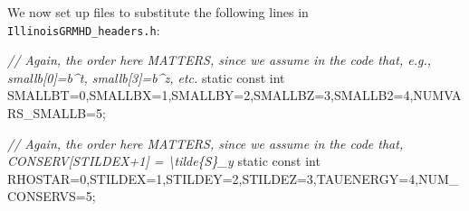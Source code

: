 \documentclass[landscape,letterpaper,10pt,english]{article}
\newenvironment{Shaded}{}{}
\newcommand{\DataTypeTok}[1]{\textcolor[rgb]{0.56,0.13,0.00}{{#1}}}
\newcommand{\DecValTok}[1]{\textcolor[rgb]{0.25,0.63,0.44}{{#1}}}
\newcommand{\CommentTok}[1]{\textcolor[rgb]{0.38,0.63,0.69}{\textit{{#1}}}}
\newcommand{\NormalTok}[1]{{#1}}
\begin{document}
\[\label{smallb_and_conservs_vars}\]

We now set up files to substitute the following lines in
\texttt{IllinoisGRMHD\_headers.h}:

\begin{Shaded}
\begin{Highlighting}[]
\CommentTok{// Again, the order here MATTERS, since we assume in the code that, e.g., smallb[0]=b^t, smallb[3]=b^z, etc.}
\DataTypeTok{static} \DataTypeTok{const} \DataTypeTok{int}\NormalTok{ SMALLBT=}\DecValTok{0}\NormalTok{,SMALLBX=}\DecValTok{1}\NormalTok{,SMALLBY=}\DecValTok{2}\NormalTok{,SMALLBZ=}\DecValTok{3}\NormalTok{,SMALLB2=}\DecValTok{4}\NormalTok{,NUMVARS_SMALLB=}\DecValTok{5}\NormalTok{;}

\CommentTok{// Again, the order here MATTERS, since we assume in the code that, CONSERV[STILDEX+1] = \textbackslash{}tilde\{S\}_y}
\DataTypeTok{static} \DataTypeTok{const} \DataTypeTok{int}\NormalTok{ RHOSTAR=}\DecValTok{0}\NormalTok{,STILDEX=}\DecValTok{1}\NormalTok{,STILDEY=}\DecValTok{2}\NormalTok{,STILDEZ=}\DecValTok{3}\NormalTok{,TAUENERGY=}\DecValTok{4}\NormalTok{,NUM_CONSERVS=}\DecValTok{5}\NormalTok{;}
\end{Highlighting}
\end{Shaded}
\end{document}
